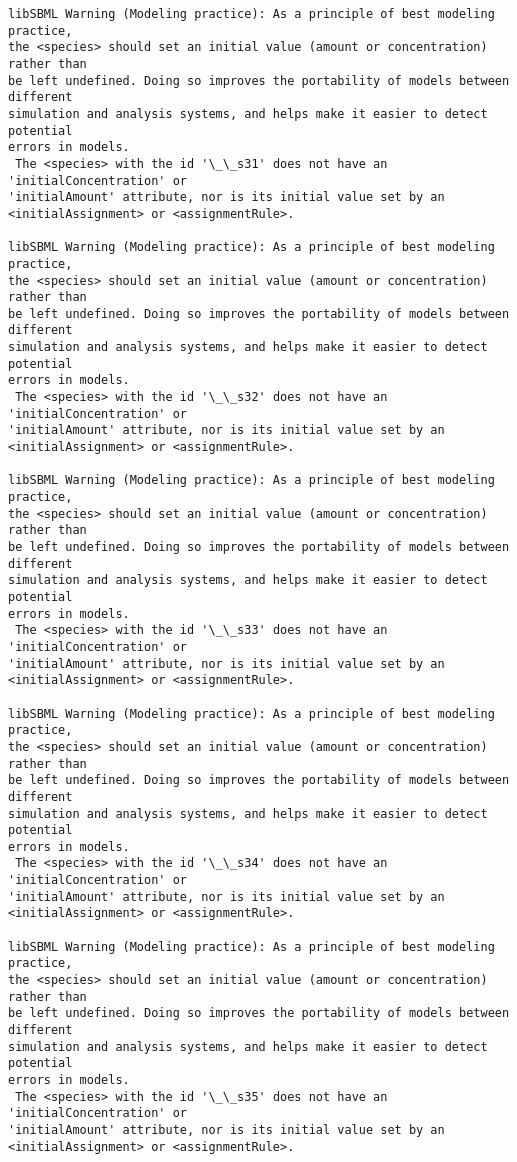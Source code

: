 \documentclass[11pt]{article}
\begin{document}
\begin{Verbatim}[commandchars=\\\{\}]
libSBML Warning (Modeling practice): As a principle of best modeling practice,
the <species> should set an initial value (amount or concentration) rather than
be left undefined. Doing so improves the portability of models between different
simulation and analysis systems, and helps make it easier to detect potential
errors in models.
 The <species> with the id '\_\_s31' does not have an 'initialConcentration' or
'initialAmount' attribute, nor is its initial value set by an
<initialAssignment> or <assignmentRule>.

libSBML Warning (Modeling practice): As a principle of best modeling practice,
the <species> should set an initial value (amount or concentration) rather than
be left undefined. Doing so improves the portability of models between different
simulation and analysis systems, and helps make it easier to detect potential
errors in models.
 The <species> with the id '\_\_s32' does not have an 'initialConcentration' or
'initialAmount' attribute, nor is its initial value set by an
<initialAssignment> or <assignmentRule>.

libSBML Warning (Modeling practice): As a principle of best modeling practice,
the <species> should set an initial value (amount or concentration) rather than
be left undefined. Doing so improves the portability of models between different
simulation and analysis systems, and helps make it easier to detect potential
errors in models.
 The <species> with the id '\_\_s33' does not have an 'initialConcentration' or
'initialAmount' attribute, nor is its initial value set by an
<initialAssignment> or <assignmentRule>.

libSBML Warning (Modeling practice): As a principle of best modeling practice,
the <species> should set an initial value (amount or concentration) rather than
be left undefined. Doing so improves the portability of models between different
simulation and analysis systems, and helps make it easier to detect potential
errors in models.
 The <species> with the id '\_\_s34' does not have an 'initialConcentration' or
'initialAmount' attribute, nor is its initial value set by an
<initialAssignment> or <assignmentRule>.

libSBML Warning (Modeling practice): As a principle of best modeling practice,
the <species> should set an initial value (amount or concentration) rather than
be left undefined. Doing so improves the portability of models between different
simulation and analysis systems, and helps make it easier to detect potential
errors in models.
 The <species> with the id '\_\_s35' does not have an 'initialConcentration' or
'initialAmount' attribute, nor is its initial value set by an
<initialAssignment> or <assignmentRule>.


\end{Verbatim}
\end{document}
